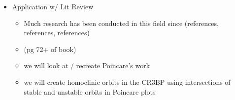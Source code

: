 \documentclass{article}
\begin{document}
\begin{itemize}
\begin{itemize}
	  \end{itemize}
	\item Application w/ Lit Review
	  \begin{itemize}
	  	\item \color{red}Much research has been conducted in this field since (references, references, references)\color{black}
	  	\item (pg 72+ of book)
	  	\item we will look at / recreate Poincare's work
	  	\item we will create homoclinic orbits in the CR3BP using intersections of stable and unstable orbits in Poincare plots
	  \end{itemize}
\end{itemize}

\cite{KoonLoMarsdenRoss2011}


\end{document}
